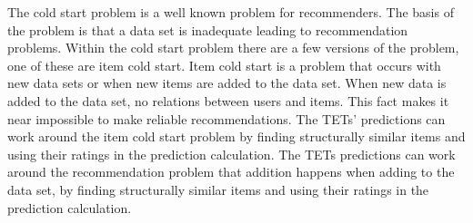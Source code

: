 The cold start problem is a well known problem for recommenders\cite{Ricci2015}\cite{saveski2014item}.
The basis of the problem is that a data set is 
inadequate leading to recommendation problems.
Within the cold start problem there are a few versions of the problem, one of these are item cold start.
Item cold start is a problem that occurs with new data sets or when new items are added to the data set.
When new data is added to the data set, no relations between users and items.
This fact makes it near impossible to make reliable recommendations.
The TETs' predictions can work around the item cold start problem by finding structurally similar items and using their ratings in the prediction calculation.
The TETs predictions can work around the recommendation problem that addition happens when adding to the data set, by finding structurally similar items and using their ratings in the prediction calculation.
